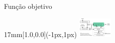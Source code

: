   






















\begin{frame}{Função objetivo}
  \begin{textblock*}{17mm}[1.0,0.0](\paperwidth-1px,1px)
    \includegraphics[width=17mm]{blocos_s3.png}
  \end{textblock*}
\end{frame}
\addtocounter{framenumber}{-1}

